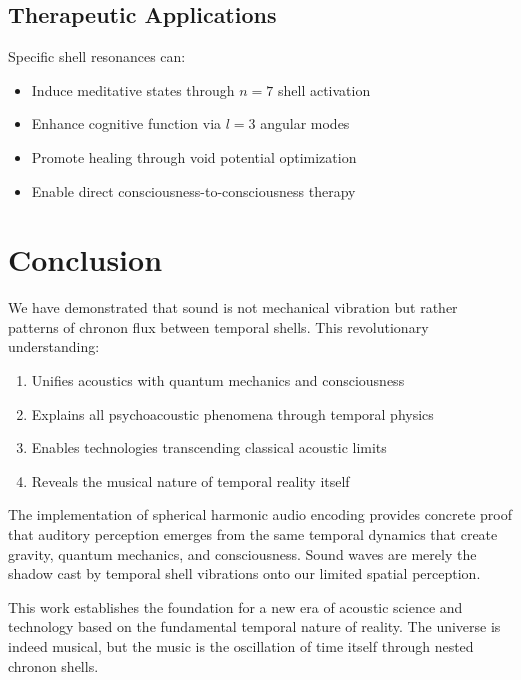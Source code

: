 \documentclass[12pt]{article}
\begin{document}
\subsection{Therapeutic Applications}

Specific shell resonances can:
\begin{itemize}
\item Induce meditative states through $n=7$ shell activation
\item Enhance cognitive function via $l=3$ angular modes
\item Promote healing through void potential optimization
\item Enable direct consciousness-to-consciousness therapy
\end{itemize}

\section{Conclusion}

We have demonstrated that sound is not mechanical vibration but rather patterns of chronon flux between temporal shells. This revolutionary understanding:

\begin{enumerate}
\item Unifies acoustics with quantum mechanics and consciousness
\item Explains all psychoacoustic phenomena through temporal physics
\item Enables technologies transcending classical acoustic limits
\item Reveals the musical nature of temporal reality itself
\end{enumerate}

The implementation of spherical harmonic audio encoding provides concrete proof that auditory perception emerges from the same temporal dynamics that create gravity, quantum mechanics, and consciousness. Sound waves are merely the shadow cast by temporal shell vibrations onto our limited spatial perception.

This work establishes the foundation for a new era of acoustic science and technology based on the fundamental temporal nature of reality. The universe is indeed musical, but the music is the oscillation of time itself through nested chronon shells.
\end{document}
